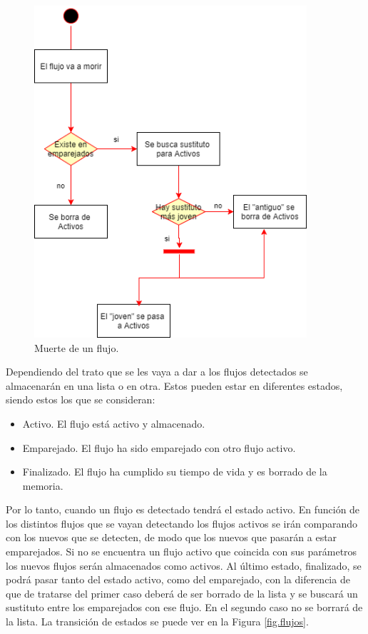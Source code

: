 \begin{figure}[H]
  \includegraphics[width=0.9\textwidth]{imagenes/muerte.png}
  \centering
  \caption{Muerte de un flujo.}\label{fig.muerte}
\end{figure}

\intro Dependiendo del trato que se les vaya a dar a los flujos detectados se almacenarán en una lista o en otra. Estos pueden estar 
en diferentes estados, siendo estos los que se consideran:

\begin{itemize}
\item Activo. El flujo está activo y almacenado.
\item Emparejado. El flujo ha sido emparejado con otro flujo activo.
\item Finalizado. El flujo ha cumplido su tiempo de vida y es borrado de la memoria.
\end{itemize}

\intro Por lo tanto, cuando un flujo es detectado tendrá el estado activo. En función 
de los distintos flujos que se vayan detectando los flujos activos se irán comparando con los nuevos que se detecten, de modo que los 
nuevos que pasarán a estar emparejados. Si no se encuentra un flujo activo que coincida con sus parámetros los nuevos flujos serán 
almacenados como activos. Al último estado, finalizado, se podrá pasar tanto del estado activo, como del emparejado, con la diferencia 
de que de tratarse del primer caso deberá de ser borrado de la lista y se buscará un sustituto entre los emparejados con ese flujo. En 
el segundo caso no se borrará de la lista. La transición de estados se puede ver en la Figura \ref{fig.flujos}.

